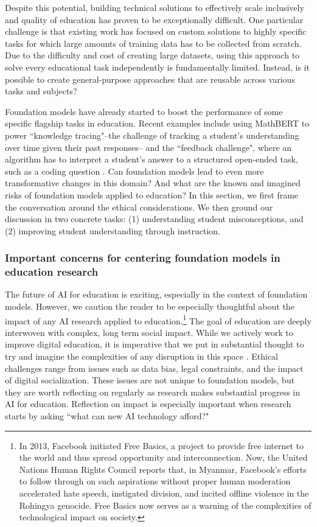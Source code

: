 Despite this potential, building technical solutions to effectively scale inclusively and quality of education has proven to be exceptionally difficult. One particular challenge is that existing work has focused on custom solutions to highly specific tasks for which large amounts of training data has to be collected from scratch. Due to the difficulty and cost of creating large datasets, using this approach to solve every educational task independently is fundamentally limited. Instead, is it possible to create general-purpose approaches that are reusable across various tasks and subjects? 

Foundation models have already started to boost the performance of some specific flagship tasks in education. Recent examples include using MathBERT \cite{shen2021mathbert} to power ``knowledge tracing"--the challenge of tracking a student's understanding over time given their past responses-- and the ``feedback challenge", where an algorithm has to interpret a student's answer to a structured open-ended task, such as a coding question \citep{wu2021prototransf}. Can foundation models lead to even more transformative changes in this domain? And what are the known and imagined risks of foundation models applied to education? In this section, we first frame the conversation around the ethical considerations. We then ground our discussion in two concrete tasks: (1) understanding student misconceptions, and (2) improving student understanding through instruction. 

\subsubsection{Important concerns for centering foundation models in education research}

The future of AI for education is exciting, especially in the context of foundation models. However, we caution the reader to be especially thoughtful about the impact of any AI research applied to education.\footnote{In 2013, Facebook initiated Free Basics, a project to provide free internet to the world and thus spread opportunity and interconnection. Now, the United Nations Human Rights Council reports that, in Myanmar, Facebook’s efforts to follow through on such aspirations without proper human moderation accelerated hate speech, instigated division, and incited offline violence in the Rohingya genocide. Free Basics now serves as a warning of the complexities of technological impact on society.} The goal of education are deeply interwoven with complex, long term social impact. While we actively work to improve digital education, it is imperative that we put in substantial thought to try and imagine the complexities of any disruption in this space \cite{einsteinVision}. Ethical challenges range from issues such as data bias, legal constraints, and the impact of digital socialization. These issues are not unique to foundation models, but they are worth reflecting on regularly as research makes substantial progress in AI for education. Reflection on impact is especially important when research starts by asking ``what can new AI technology afford?"  

